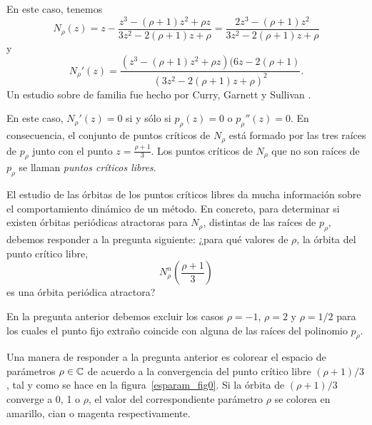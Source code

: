 En este caso, tenemos
$$
N_{\rho} (z) =  z -
 \frac{z^3 - (\rho + 1) z^2 + \rho z}{ 3 z^2 - 2 (\rho + 1 )z + \rho}
= \frac{2 z^3 - (\rho + 1 ) z^2}{ 3 z^2 - 2 (\rho + 1) z + \rho}
$$
y
$$
N_{\rho}'(z) = \frac{( z^3 - (\rho +1 )z^2 + \rho z) ( 6 z - 2
(\rho +1)}{ (3 z^2 - 2 (\rho + 1) z + \rho )^2}.
$$
Un estudio sobre de familia fue hecho por Curry, Garnett  y
Sullivan  \cite{CGS}.


En este caso,  $ N_{\rho}'(z) = 0 $ si y sólo si $p_{\rho}
(z) = 0$  o $ p_{\rho}''(z) =
0$.  En consecuencia, el conjunto de puntos críticos de $ N_{\rho}$ está formado por  las tres raíces de $ p_{\rho}$ junto con el punto $ z = \frac{\rho +1 }{3}$. Los puntos
críticos de $N_{\rho}$ que no son raíces de $
p_{\rho}$ se llaman \emph{puntos críticos libres}.%

El estudio de las órbitas de los puntos críticos libres da mucha información sobre el comportamiento dinámico de un método. En concreto, para determinar si
existen órbitas periódicas atractoras para $N_{\rho}$,
distintas de las raíces de $ p_{\rho}$, debemos responder
a la pregunta siguiente: ¿para  qué valores de $\rho$, la órbita del punto crítico libre, 
$$
N_{\rho}^{n}\left(\frac{\rho+1}{3}\right)
$$ 
es una órbita periódica
atractora?



En la pregunta anterior debemos excluir los casos
 $ \rho = -1$, $ \rho = 2 $ y
$ \rho = 1/2$ para los cuales el punto fijo extraño coincide con alguna de las raíces del polinomio   $ p_{\rho}$.


Una manera de responder a la pregunta anterior es colorear el espacio de parámetros $\rho\in\mathbb{C}$ de acuerdo a la convergencia del punto crítico libre $(\rho+1)/3$, tal y como se hace en la figura~\ref{esparam_fig0}. Si la órbita de $(\rho+1)/3$ converge a 0, 1 o $\rho$, el valor del correspondiente parámetro $\rho$ se colorea en amarillo, cian o magenta respectivamente.

